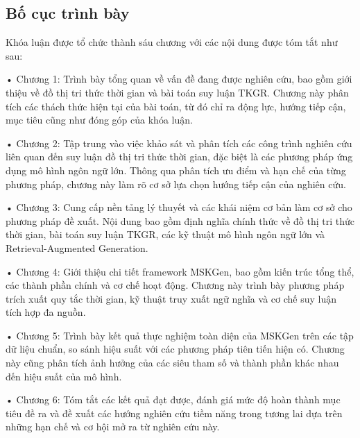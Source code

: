 \subsection{Bố cục trình bày}
Khóa luận được tổ chức thành sáu chương với các nội dung được tóm tắt như sau:

• Chương 1: Trình bày tổng quan về vấn đề đang được nghiên cứu, bao gồm giới thiệu về đồ thị tri thức thời gian và bài toán suy luận TKGR. Chương này phân tích các thách thức hiện tại của bài toán, từ đó chỉ ra động lực, hướng tiếp cận, mục tiêu cũng như đóng góp của khóa luận.

• Chương 2: Tập trung vào việc khảo sát và phân tích các công trình nghiên cứu liên quan đến suy luận đồ thị tri thức thời gian, đặc biệt là các phương pháp ứng dụng mô hình ngôn ngữ lớn. Thông qua phân tích ưu điểm và hạn chế của từng phương pháp, chương này làm rõ cơ sở lựa chọn hướng tiếp cận của nghiên cứu.

• Chương 3: Cung cấp nền tảng lý thuyết và các khái niệm cơ bản làm cơ sở cho phương pháp đề xuất. Nội dung bao gồm định nghĩa chính thức về đồ thị tri thức thời gian, bài toán suy luận TKGR, các kỹ thuật mô hình ngôn ngữ lớn và Retrieval-Augmented Generation.

• Chương 4: Giới thiệu chi tiết framework MSKGen, bao gồm kiến trúc tổng thể, các thành phần chính và cơ chế hoạt động. Chương này trình bày phương pháp trích xuất quy tắc thời gian, kỹ thuật truy xuất ngữ nghĩa và cơ chế suy luận tích hợp đa nguồn.

• Chương 5: Trình bày kết quả thực nghiệm toàn diện của MSKGen trên các tập dữ liệu chuẩn, so sánh hiệu suất với các phương pháp tiên tiến hiện có. Chương này cũng phân tích ảnh hưởng của các siêu tham số và thành phần khác nhau đến hiệu suất của mô hình.

• Chương 6: Tóm tắt các kết quả đạt được, đánh giá mức độ hoàn thành mục tiêu đề ra và đề xuất các hướng nghiên cứu tiềm năng trong tương lai dựa trên những hạn chế và cơ hội mở ra từ nghiên cứu này.
